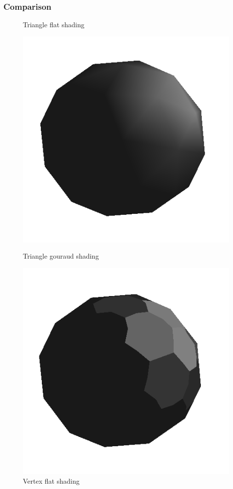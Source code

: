 \subsubsection{Comparison}
\color{red}{TODO: add armadillo, horse, etc. images with these 3 effects (flat shading 1 and 2, gouraud shading)}
\color{black} %
\begin{figure}[!h]
    \centering
    \centering
    \caption{Triangle flat shading}\label{fig:flat-shading-triangle}
    \endminipage\hfill
    \centering
    \includegraphics[scale=0.5]{images/gouraudshading.png}
    \caption{Triangle gouraud shading}\label{fig:gouraud-shading}
    \endminipage\hfill
    \centering
    \includegraphics[scale=0.5]{images/extentflatshading.png}
    \caption{Vertex flat shading}\label{fig:flat-shading-vertex}
    \endminipage
\end{figure}


